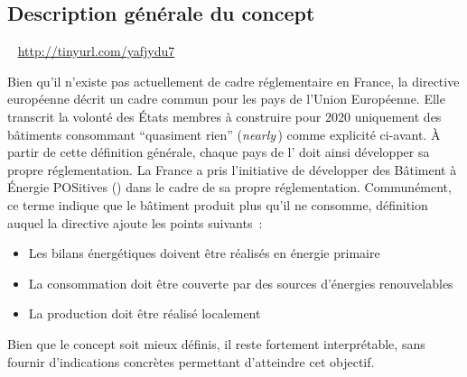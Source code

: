 



\subsection{Description générale du concept} %
\label{sub:description_generale_du_concept}
~
\href{Further development of EU energy efficiency policies}{http://tinyurl.com/yafjydu7}


Bien qu’il n’existe pas actuellement de cadre réglementaire en France,
la directive européenne  \parencite{EPBD2010} décrit un cadre commun pour les pays
de l’Union Européenne. Elle transcrit la volonté des États membres à construire pour $2020$
uniquement des bâtiments consommant \enquote{quasiment rien} (\textit{nearly}\,) comme explicité ci-avant.
À partir de cette définition générale, chaque pays de l’ doit ainsi développer sa
propre réglementation. La France a pris l’initiative de développer des Bâtiment à
Énergie POSitives () dans le cadre de sa propre réglementation. Communément,
ce terme indique que le bâtiment produit plus qu’il ne consomme, définition
auquel la directive ajoute les points suivants~:
\begin{itemize}
    \item Les bilans énergétiques doivent être réalisés en énergie primaire
    \item La consommation doit être couverte par des sources d’énergies renouvelables
    \item La production doit être réalisé localement
\end{itemize}
Bien que le concept soit mieux définis, il reste fortement interprétable,
sans fournir d’indications concrètes permettant d’atteindre cet objectif.

